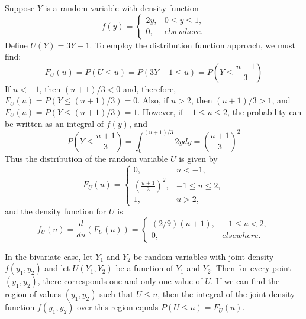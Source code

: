 \documentclass[12pt, a4paper, twoside, openright, titlepage]{book}
\begin{document}
\begin{eg}{}{}
    Suppose $Y$ is a random variable with density function \begin{equation*}
        f(y) = \left\{\begin{array}{lc} 2y, & 0 \leq y \leq 1, \\ 0, & elsewhere. \end{array}\right.
    \end{equation*}
    Define $U(Y) = 3Y - 1$. To employ the distribution function approach, we must find: \begin{equation*}
        F_U(u) = P(U\leq u) = P(3Y - 1 \leq u) = P\left(Y \leq \frac{u+1}{3}\right)
    \end{equation*}
    If $u < -1$, then $(u+1)/3 < 0$ and, therefore, $F_U(u) = P(Y\leq (u+1)/3) = 0$. Also, if $u > 2$, then $(u+1)/3 > 1$, and $F_U(u) = P(Y\leq (u+1)/3) = 1$. However, if $-1 \leq u \leq 2$, the probability can be written as an integral of $f(y)$, and \begin{equation*}
        P\left(Y\leq \frac{u+1}{3}\right) = \int_{0}^{(u+1)/3}2ydy = \left(\frac{u+1}{3}\right)^2
    \end{equation*}
    Thus the distribution of the random variable $U$ is given by \begin{equation*}
        F_U(u) = \left\{\begin{array}{lc} 0, & u < -1, \\ \left(\frac{u+1}{3}\right)^2, & -1 \leq u \leq 2, \\ 1, & u > 2, \end{array}\right.
    \end{equation*}
    and the density function for $U$ is \begin{equation*}
        f_U(u) = \frac{d}{du}(F_U(u)) = \left\{\begin{array}{lc} (2/9)(u+1), & -1 \leq u < 2, \\ 0, & elsewhere.\end{array}\right.
    \end{equation*}
\end{eg}

In the bivariate case, let $Y_1$ and $Y_2$ be random variables with joint density $f(y_1,y_2)$ and let $U(Y_1,Y_2)$ be a function of $Y_1$ and $Y_2$. Then for every point $(y_1,y_2)$, there corresponds one and only one value of $U$. If we can find the region of values $(y_1,y_2)$ such that $U \leq u$, then the integral of the joint density function $f(y_1,y_2)$ over this region equals $P(U\leq u) = F_U(u)$.
\end{document}
